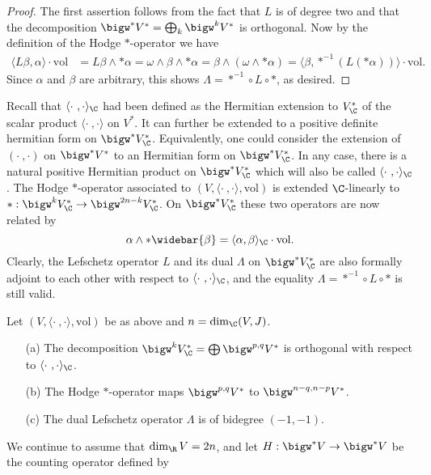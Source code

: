 \begin{proof}
The first assertion follows from the fact that $L$ is of degree two and that the decomposition $\bigw^*V^*=\bigoplus_k\bigw^kV^*$ is orthogonal. Now by the definition of the Hodge $\ast$-operator we have
\begin{align*}
\langle L\beta,\alpha\rangle\cdot\mathrm{vol}&=L\beta\wedge\ast\alpha=\omega\wedge\beta\wedge\ast\alpha=\beta\wedge(\omega\wedge\ast\alpha)=\langle\beta,\ast^{-1}(L(\ast\alpha))\rangle\cdot\mathrm{vol}.
\end{align*}
Since $\alpha$ and $\beta$ are arbitrary, this shows $\Lambda=\ast^{-1}\circ L\circ\ast$, as desired.
\end{proof}
Recall that $\langle\cdot\ ,\cdot\rangle_{\C}$ had been defined as the Hermitian extension to $V^*_{\C}$ of the scalar product $\langle\cdot\ ,\cdot\rangle$ on $V^*$. It can further be extended to a positive definite hermitian form on $\bigw^*V_{\C}^*$. Equivalently, one could consider the extension of $(\cdot\ ,\cdot)$ on $\bigw^*V^*$ to an Hermitian form on $\bigw^*V^*_{\C}$. In any case, there is a natural positive Hermitian product on $\bigw^*V^*_{\C}$ which will also be called $\langle\cdot\ ,\cdot\rangle_{\C}$. The Hodge $\ast$-operator associated to $(V,\langle\cdot\ ,\cdot\rangle,\mathrm{vol})$ is extended $\C$-linearly to $\ast:\bigw^kV^*_{\C}\to\bigw^{2n-k}V_{\C}^*$. On $\bigw^*V^*_{\C}$ these two operators are now related by
\[\alpha\wedge\ast\widebar{\beta}=\langle\alpha,\beta\rangle_{\C}\cdot\mathrm{vol}.\]
Clearly, the Lefschetz operator $L$ and its dual $\Lambda$ on $\bigw^*V^*_{\C}$ are also formally adjoint to each other with respect to $\langle\cdot\ ,\cdot\rangle_{\C}$, and the equality $\Lambda=\ast^{-1}\circ L\circ\ast$ is still valid.
\begin{proposition}\label{almost complex space Lefschetz dual operator prop}
Let $(V,\langle\cdot\ ,\cdot\rangle,\mathrm{vol})$ be as above and $n=\dim_{\C}(V,J)$.
\begin{itemize}
\item[(a)] The decomposition $\bigw^kV^*_{\C}=\bigoplus\bigw^{p,q}V^*$ is orthogonal with respect to $\langle\cdot\ ,\cdot\rangle_{\C}$.
\item[(b)] The Hodge $\ast$-operator maps $\bigw^{p,q}V^*$ to $\bigw^{n-q,n-p}V^*$.
\item[(c)] The dual Lefschetz operator $\Lambda$ is of bidegree $(-1,-1)$.
\end{itemize}
\end{proposition}
We continue to assume that $\dim_{\R}V=2n$, and let $H:\bigw^*V\to\bigw^*V$ be the counting operator defined by
